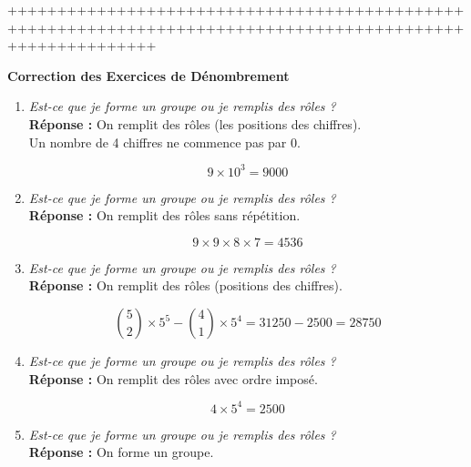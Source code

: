 \documentclass[12pt]{article}
\begin{document}
+++++++++++++++++++++++++++++++++++++++++++++++++++++++++++++++++++++++++++++++++++++++++++++++++++++++++++

\begin{center}
    \Large \textbf{Correction des Exercices de Dénombrement}
\end{center}

\vspace{0.5cm}

\begin{enumerate}[label=\textbf{Exercice \arabic*.}]

\item \textit{Est-ce que je forme un groupe ou je remplis des rôles ?}\\
\textbf{Réponse :} On remplit des rôles (les positions des chiffres).\\

Un nombre de 4 chiffres ne commence pas par 0.

\[
9 \times 10^3 = 9000
\]

\vspace{0.3cm}

\item \textit{Est-ce que je forme un groupe ou je remplis des rôles ?}\\
\textbf{Réponse :} On remplit des rôles sans répétition.

\[
9 \times 9 \times 8 \times 7 = 4536
\]

\vspace{0.3cm}

\item \textit{Est-ce que je forme un groupe ou je remplis des rôles ?}\\
\textbf{Réponse :} On remplit des rôles (positions des chiffres).

\[
\binom{5}{2} \times 5^5 - \binom{4}{1} \times 5^4
= 31250 - 2500 = 28750
\]

\vspace{0.3cm}

\item \textit{Est-ce que je forme un groupe ou je remplis des rôles ?}\\
\textbf{Réponse :} On remplit des rôles avec ordre imposé.

\[
4 \times 5^4 = 2500
\]

\vspace{0.3cm}

\item \textit{Est-ce que je forme un groupe ou je remplis des rôles ?}\\
\textbf{Réponse :} On forme un groupe.


\end{enumerate}
\end{document}
